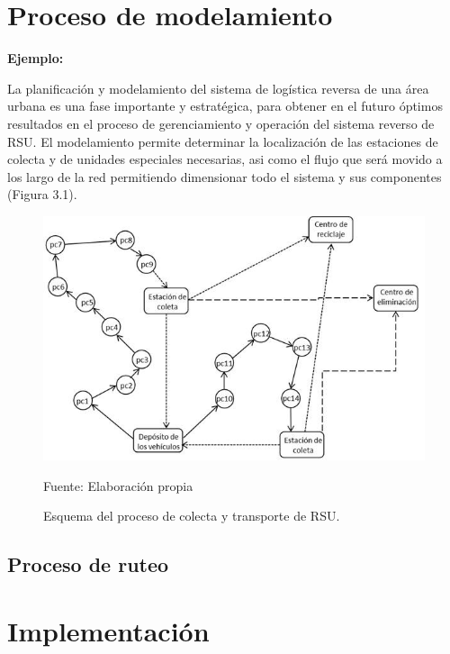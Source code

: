 \section{Proceso de modelamiento} 

{\bf Ejemplo:}\par

La planificación y modelamiento del sistema de logística reversa de una área urbana es una fase importante y estratégica, para obtener en el futuro óptimos resultados en el proceso de gerenciamiento y operación del sistema reverso de RSU. El modelamiento permite determinar la localización de las estaciones de colecta y de unidades especiales necesarias, asi como el flujo que será movido a los largo de la red permitiendo dimensionar todo el sistema y sus componentes (Figura 3.1).
\vskip 0.3cm
\begin{figure}[ht]
\begin{center}
\includegraphics[width=.6\textwidth]{Figura3}
\end{center}
\begin{center}
\vskip -0.5cm
\caption{\small{Esquema del proceso de colecta y transporte de RSU.}}
{\small{Fuente: Elaboración propia}}
\end{center}
\end{figure}

\subsection{Proceso de ruteo}

\section{Implementación} 
























